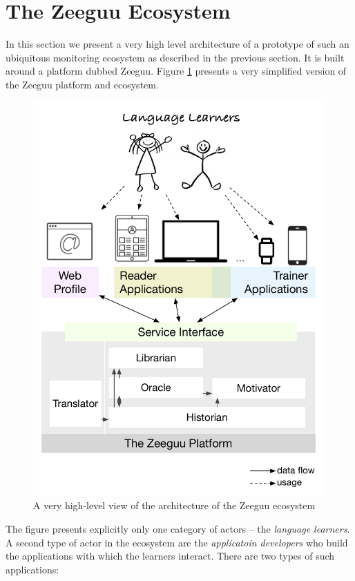 

\section {The Zeeguu Ecosystem}
In this section we present a very high level architecture of a prototype of such an ubiquitous monitoring ecosystem as described in the previous section. It is built around a platform dubbed Zeeguu. Figure \ref{fig:architecture} presents a very simplified version of the Zeeguu platform and ecosystem.

\begin{figure}[h!]
	\includegraphics[width=0.98\linewidth]{images/zeeguu-architecture.pdf}
	\caption{A very high-level view of the architecture of the Zeeguu ecosystem}
	\label{fig:architecture}
\end{figure}

The figure presents explicitly only one category of actors -- the {\em language learners}. A second type of actor in the ecosystem are the {\em applicatoin developers} who build the applications with which the learners interact. There are two types of such applications: 

